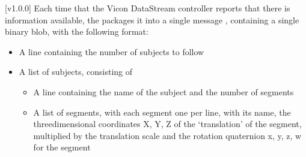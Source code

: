 [v1.0.0]
Each time that the Vicon DataStream controller reports that there is information
available, the  packages it into a single message
\openSq{}\closeSq, containing a single binary blob, with the following
format:
\begin{itemize}
\item A line containing the number of subjects to follow
\item\exSp{}A list of subjects, consisting of
\begin{itemize}
\item A line containing the name of the subject and the number of segments
\item\exSp{}A list of segments, with each segment one per line, with its name, the
three\longDash{}dimensional coordinates \openSq{}X, Y, Z\closeSq{} of the `translation'
of the segment, multiplied by the translation scale and the rotation quaternion
\openSq{}x, y, z, w\closeSq{} for the segment
\end{itemize}
\end{itemize}
\primaryEnd{}
